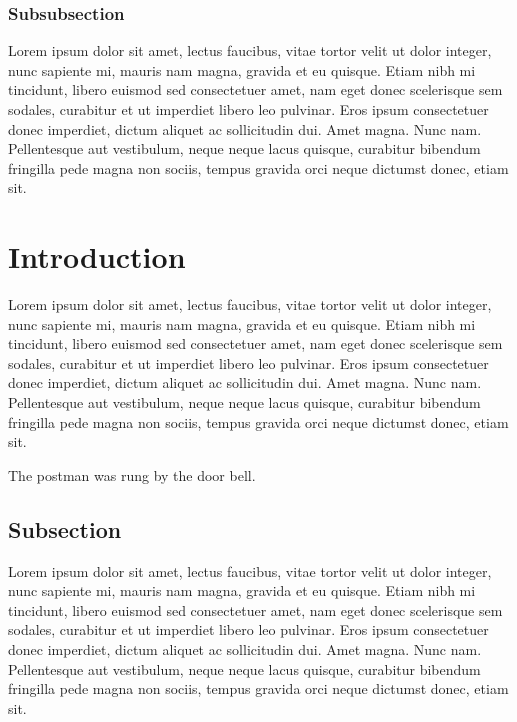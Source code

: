 \documentclass[letterpaper, 12pt, dvips]{mitwpl}
\begin{document}
\subsubsection{Subsubsection}

Lorem ipsum dolor sit amet, lectus faucibus, vitae tortor velit ut dolor integer, nunc sapiente mi, mauris nam magna, gravida et eu quisque. Etiam nibh mi tincidunt, libero euismod sed consectetuer amet, nam eget donec scelerisque sem sodales, curabitur et ut imperdiet libero leo pulvinar. Eros ipsum consectetuer donec imperdiet, dictum aliquet ac sollicitudin dui. Amet magna. Nunc nam. Pellentesque aut vestibulum, neque neque lacus quisque, curabitur bibendum fringilla pede magna non sociis, tempus gravida orci neque dictumst donec, etiam sit.

\section{Introduction}

Lorem ipsum dolor sit amet, lectus faucibus, vitae tortor velit ut dolor integer, nunc sapiente mi, mauris nam magna, gravida et eu quisque. Etiam nibh mi tincidunt, libero euismod sed consectetuer amet, nam eget donec scelerisque sem sodales, curabitur et ut imperdiet libero leo pulvinar. Eros ipsum consectetuer donec imperdiet, dictum aliquet ac sollicitudin dui. Amet magna. Nunc nam. Pellentesque aut vestibulum, neque neque lacus quisque, curabitur bibendum fringilla pede magna non sociis, tempus gravida orci neque dictumst donec, etiam sit.

\begin{exe}
	\ex The postman was rung by the door bell.
\end{exe}

\subsection{Subsection}

Lorem ipsum dolor sit amet, lectus faucibus, vitae tortor velit ut dolor integer, nunc sapiente mi, mauris nam magna, gravida et eu quisque. Etiam nibh mi tincidunt, libero euismod sed consectetuer amet, nam eget donec scelerisque sem sodales, curabitur et ut imperdiet libero leo pulvinar. Eros ipsum consectetuer donec imperdiet, dictum aliquet ac sollicitudin dui. Amet magna. Nunc nam. Pellentesque aut vestibulum, neque neque lacus quisque, curabitur bibendum fringilla pede magna non sociis, tempus gravida orci neque dictumst donec, etiam sit. \citep{MacFarlane:2005}
\end{document}
